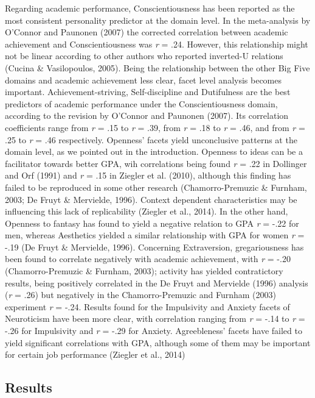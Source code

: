 \documentclass[,man]{apa6}
\theoremstyle{definition}
\theoremstyle{definition}
\theoremstyle{definition}
\theoremstyle{remark}
\begin{document}
Regarding academic performance, Conscientiousness has been reported as
the most consistent personality predictor at the domain level. In the
meta-analysis by O'Connor and Paunonen (2007) the corrected correlation
between academic achievement and Conscientiousness was \emph{r} = .24.
However, this relationship might not be linear according to other
authors who reported inverted-U relations (Cucina \& Vasilopoulos,
2005). Being the relationship between the other Big Five domains and
academic achievement less clear, facet level analysis becomes important.
Achievement-striving, Self-discipline and Dutifulness are the best
predictors of academic performance under the Conscientiousness domain,
according to the revision by O'Connor and Paunonen (2007). Its
correlation coefficients range from \emph{r} = .15 to \emph{r} = .39,
from \emph{r} = .18 to \emph{r} = .46, and from \emph{r} = .25 to
\emph{r} = .46 respectively. Openness' facets yield unconclusive
patterns at the domain level, as we pointed out in the introduction.
Openness to ideas can be a facilitator towards better GPA, wih
correlations being found \emph{r} = .22 in Dollinger and Orf (1991) and
\emph{r} = .15 in Ziegler et al. (2010), although this finding has
failed to be reproduced in some other research (Chamorro-Premuzic \&
Furnham, 2003; De Fruyt \& Mervielde, 1996). Context dependent
characteristics may be influencing this lack of replicability (Ziegler
et al., 2014). In the other hand, Openness to fantasy has found to yield
a negative relation to GPA \emph{r} = -.22 for men, whereas Aesthetics
yielded a similar relationship with GPA for women \emph{r} = -.19 (De
Fruyt \& Mervielde, 1996). Concerning Extraversion, gregariousness has
been found to correlate negatively with academic achievement, with
\emph{r} = -.20 (Chamorro-Premuzic \& Furnham, 2003); activity has
yielded contratictory results, being positively correlated in the De
Fruyt and Mervielde (1996) analysis (\emph{r} = .26) but negatively in
the Chamorro-Premuzic and Furnham (2003) experiment \emph{r} = -.24.
Results found for the Impulsivity and Anxiety facets of Neuroticism have
been more clear, with correlation ranging from \emph{r} = -.14 to
\emph{r} = -.26 for Impulsivity and \emph{r} = -.29 for Anxiety.
Agreebleness' facets have failed to yield significant correlations with
GPA, although some of them may be important for certain job performance
(Ziegler et al., 2014)

\hypertarget{results}{%
\subsection{Results}\label{results}}
\end{document}
